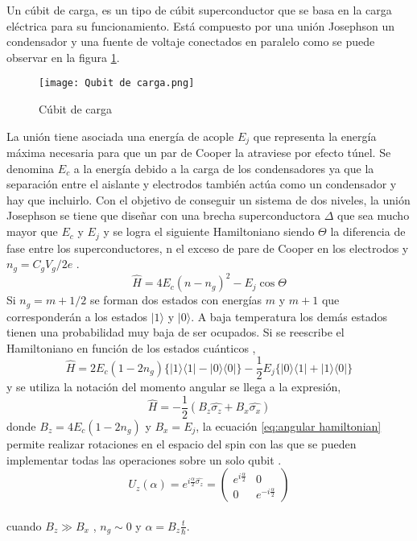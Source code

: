 \documentclass[12pt]{article}
\begin{document}
Un cúbit de carga, es un tipo de cúbit superconductor que se basa en la carga eléctrica para su funcionamiento. Está compuesto por una unión Josephson un condensador y una fuente de voltaje conectados en paralelo como se puede observar en la figura \ref{fig:Cúbit de carga}.\\
\begin{figure}[ht]
  \centering
  \texttt{[image: Qubit de carga.png]}
  \caption{Cúbit de carga \cite{gu_microwave_2017}}
  \label{fig:Cúbit de carga}
\end{figure}
 
La unión tiene asociada una energía de acople $E_j$ que representa la energía máxima necesaria para que un par de Cooper la atraviese por efecto túnel. Se denomina $E_c$ a la energía debido a la carga de los condensadores ya que la separación entre el aislante y electrodos también actúa como un condensador y hay que incluirlo. Con el objetivo de conseguir un sistema de dos niveles, la unión Josephson se tiene que diseñar con una brecha superconductora $\Delta$ que sea mucho mayor que $E_c$ y $E_j$ y se logra el siguiente Hamiltoniano siendo $\Theta$ la diferencia de fase entre los superconductores, n el exceso de pare de Cooper en los electrodos y $n_g = C_gV_g/2e$ \cite{leonardo_qubits_2004}.
\begin{equation} \label{eq:hamiltonian}
  \widehat{H} = 4E_c(n-n_g)^2 - E_j\cos\Theta
\end{equation}
Si $n_g = m+1/2$ se forman dos estados con energías $m$ y $m + 1$ que corresponderán a los estados $|1\rangle$ y $|0\rangle$. A baja temperatura los demás estados tienen una probabilidad muy baja de ser ocupados.
Si se reescribe el Hamiltoniano en función de los estados cuánticos \cite{gu_microwave_2017} ,
\begin{equation} \label{eq:ket hamiltonian}
  \widehat{H}  = 2E_c(1-2n_g)\{|1\rangle\langle1| - |0\rangle\langle0|\} - \frac{1}{2}E_j\{|0\rangle\langle1| + |1\rangle\langle0|\}
\end{equation}
 y se utiliza la notación del momento angular se llega a la expresión,
 \begin{equation} \label{eq:angular hamiltonian}
  \widehat{H}  = - \frac{1}{2}(B_z\hat{\sigma_z}  + B_x\hat{\sigma_x})
\end{equation}
donde $B_z = 4E_c(1-2n_g)$ y $B_x=E_j$, la ecuación \ref*{eq:angular hamiltonian} permite realizar rotaciones en el espacio del spin con las que se pueden implementar todas las operaciones sobre un solo qubit \cite{leonardo_qubits_2004}. 
\begin{equation}\label{eq:1 rotation}
  U_z(\alpha )= e^{i\frac{\alpha }{2}\hat{\sigma_z}} = 
  \begin{pmatrix}
    e^{i\frac{\alpha}{2}} & 0 \\
    0 & e^{-i\frac{\alpha}{2}}
  \end{pmatrix}
\end{equation}\\
cuando $B_z \gg B_x$ ,  $n_g\sim 0$ y $\alpha = B_z \frac{t}{\hbar}$.
\end{document}
